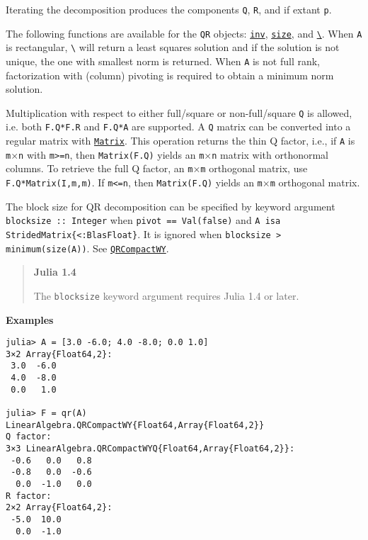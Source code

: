 \begin{adjustwidth}{2em}{0pt}
\begin{itemize}
\end{itemize}
Iterating the decomposition produces the components \texttt{Q}, \texttt{R}, and if extant \texttt{p}.

The following functions are available for the \texttt{QR} objects: \hyperlink{13336866048543706848}{\texttt{inv}}, \hyperlink{17888996102305087038}{\texttt{size}}, and \hyperlink{4639577998029770435}{\texttt{{\textbackslash}}}. When \texttt{A} is rectangular, \texttt{{\textbackslash}} will return a least squares solution and if the solution is not unique, the one with smallest norm is returned. When \texttt{A} is not full rank, factorization with (column) pivoting is required to obtain a minimum norm solution.

Multiplication with respect to either full/square or non-full/square \texttt{Q} is allowed, i.e. both \texttt{F.Q*F.R} and \texttt{F.Q*A} are supported. A \texttt{Q} matrix can be converted into a regular matrix with \hyperlink{5448927444601277512}{\texttt{Matrix}}.  This operation returns the {\textquotedbl}thin{\textquotedbl} Q factor, i.e., if \texttt{A} is \texttt{m}×\texttt{n} with \texttt{m>=n}, then \texttt{Matrix(F.Q)} yields an \texttt{m}×\texttt{n} matrix with orthonormal columns.  To retrieve the {\textquotedbl}full{\textquotedbl} Q factor, an \texttt{m}×\texttt{m} orthogonal matrix, use \texttt{F.Q*Matrix(I,m,m)}.  If \texttt{m<=n}, then \texttt{Matrix(F.Q)} yields an \texttt{m}×\texttt{m} orthogonal matrix.

The block size for QR decomposition can be specified by keyword argument \texttt{blocksize :: Integer} when \texttt{pivot == Val(false)} and \texttt{A isa StridedMatrix\{<:BlasFloat\}}. It is ignored when \texttt{blocksize > minimum(size(A))}.  See \hyperlink{15814215390089782499}{\texttt{QRCompactWY}}.

\begin{quote}
\textbf{Julia 1.4}

The \texttt{blocksize} keyword argument requires Julia 1.4 or later.

\end{quote}
\textbf{Examples}


\begin{verbatim}
julia> A = [3.0 -6.0; 4.0 -8.0; 0.0 1.0]
3×2 Array{Float64,2}:
 3.0  -6.0
 4.0  -8.0
 0.0   1.0

julia> F = qr(A)
LinearAlgebra.QRCompactWY{Float64,Array{Float64,2}}
Q factor:
3×3 LinearAlgebra.QRCompactWYQ{Float64,Array{Float64,2}}:
 -0.6   0.0   0.8
 -0.8   0.0  -0.6
  0.0  -1.0   0.0
R factor:
2×2 Array{Float64,2}:
 -5.0  10.0
  0.0  -1.0


\end{verbatim}
\end{adjustwidth}
